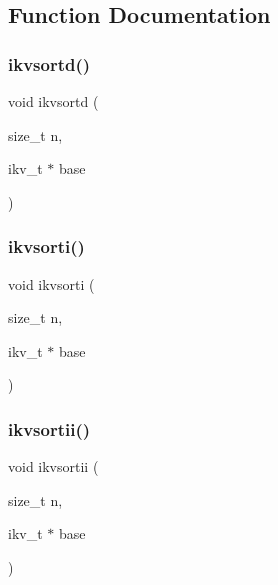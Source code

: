 \subsection{Function Documentation}
\mbox{\label{a00206_ade88b48ed46595efb31adeaff9edd061}} 
\subsubsection{\texorpdfstring{ikvsortd()}{ikvsortd()}}
{\footnotesize\ttfamily void ikvsortd (\begin{DoxyParamCaption}\item[{size\+\_\+t}]{n,  }\item[{ikv\+\_\+t $\ast$}]{base }\end{DoxyParamCaption})}

\mbox{\label{a00206_a5789edd7474ebff4ba748d7f061d86fb}} 
\subsubsection{\texorpdfstring{ikvsorti()}{ikvsorti()}}
{\footnotesize\ttfamily void ikvsorti (\begin{DoxyParamCaption}\item[{size\+\_\+t}]{n,  }\item[{ikv\+\_\+t $\ast$}]{base }\end{DoxyParamCaption})}

\mbox{\label{a00206_a1cc6186193b50112216341c8f7009826}} 
\subsubsection{\texorpdfstring{ikvsortii()}{ikvsortii()}}
{\footnotesize\ttfamily void ikvsortii (\begin{DoxyParamCaption}\item[{size\+\_\+t}]{n,  }\item[{ikv\+\_\+t $\ast$}]{base }\end{DoxyParamCaption})}

\mbox{\label{a00206_afe96a5fa1a6a4a60a13fe221567a793c}} 
